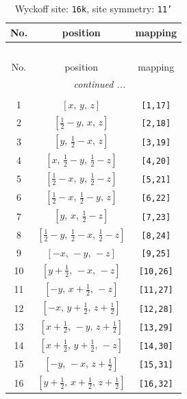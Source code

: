 \documentclass[fleqn,8pt]{jsarticle}
\begin{document}
\begin{longtable}{ccc}
\caption{Wyckoff site: {\tt 16k}, site symmetry: {\tt 11'}}
 \\
 \hline \hline
No. & position & mapping \\ \hline \endfirsthead

\multicolumn{2}{l}{\tablename\ \thetable{}} \\
 \hline \hline
No. & position & mapping \\ \hline \endhead

 \hline \hline
\multicolumn{2}{r}{\footnotesize\it continued ...} \\ \endfoot

 \hline \hline
\multicolumn{2}{r}{} \\ \endlastfoot

1 & $\left[ x,\, y,\, z \right]$ & {\tt [1,17]} \\ \hline
2 & $\left[ \frac{1}{2} - y,\, x,\, z \right]$ & {\tt [2,18]} \\ \hline
3 & $\left[ y,\, \frac{1}{2} - x,\, z \right]$ & {\tt [3,19]} \\ \hline
4 & $\left[ x,\, \frac{1}{2} - y,\, \frac{1}{2} - z \right]$ & {\tt [4,20]} \\ \hline
5 & $\left[ \frac{1}{2} - x,\, y,\, \frac{1}{2} - z \right]$ & {\tt [5,21]} \\ \hline
6 & $\left[ \frac{1}{2} - x,\, \frac{1}{2} - y,\, z \right]$ & {\tt [6,22]} \\ \hline
7 & $\left[ y,\, x,\, \frac{1}{2} - z \right]$ & {\tt [7,23]} \\ \hline
8 & $\left[ \frac{1}{2} - y,\, \frac{1}{2} - x,\, \frac{1}{2} - z \right]$ & {\tt [8,24]} \\ \hline
9 & $\left[ - x,\, - y,\, - z \right]$ & {\tt [9,25]} \\ \hline
10 & $\left[ y + \frac{1}{2},\, - x,\, - z \right]$ & {\tt [10,26]} \\ \hline
11 & $\left[ - y,\, x + \frac{1}{2},\, - z \right]$ & {\tt [11,27]} \\ \hline
12 & $\left[ - x,\, y + \frac{1}{2},\, z + \frac{1}{2} \right]$ & {\tt [12,28]} \\ \hline
13 & $\left[ x + \frac{1}{2},\, - y,\, z + \frac{1}{2} \right]$ & {\tt [13,29]} \\ \hline
14 & $\left[ x + \frac{1}{2},\, y + \frac{1}{2},\, - z \right]$ & {\tt [14,30]} \\ \hline
15 & $\left[ - y,\, - x,\, z + \frac{1}{2} \right]$ & {\tt [15,31]} \\ \hline
16 & $\left[ y + \frac{1}{2},\, x + \frac{1}{2},\, z + \frac{1}{2} \right]$ & {\tt [16,32]} \\
\end{longtable}
\end{document}

